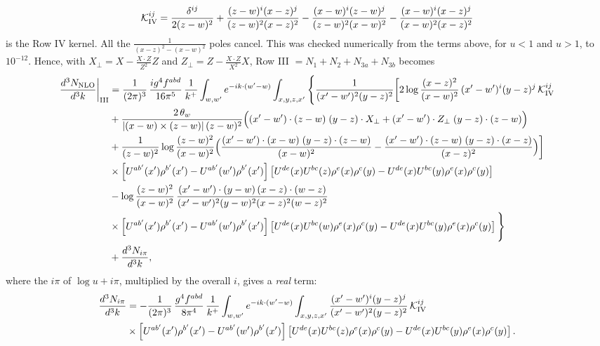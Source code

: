 \documentclass[9pt]{article}
\numberwithin{equation}{section}
\begin{document}
{\begin{equation}
\mathcal K^{ij}_{\rm IV}=\frac{\delta^{ij}}{2(z-w)^{2}}+\frac{(z-w)^{i}(x-z)^{j}}{(z-w)^{2}(x-z)^{2}}-\frac{(x-w)^{i}(z-w)^{j}}{(z-w)^{2}(x-w)^{2}}-\frac{(x-w)^{i}(x-z)^{j}}{(x-w)^{2}(x-z)^{2}}
\end{equation}
is the Row IV kernel. All the $\frac{1}{(x-z)^{2}-(x-w)^{2}}$ poles cancel. This was checked numerically from the terms above, for $u<1$ and $u>1$, to $10^{-12}$. Hence, with $X_{\perp}=X-\frac{X\cdot Z}{Z^{2}}Z$ and $Z_{\perp}=Z-\frac{X\cdot Z}{X^{2}}X$, Row III $=N_{1}+N_{2}+N_{3a}+N_{3b}$ becomes
\begin{align}
\frac{d^{3}N_{\rm NLO}}{d^{3}k}\bigg|_{\rm III}&=\frac{1}{(2\pi)^{3}}\,\frac{ig^{4}f^{abd}}{16\pi^{5}}\,\frac{1}{k^{+}}\int_{w,w'}e^{-ik\cdot(w'-w)}\int_{x,y,z,x'}\Bigg\{\frac{1}{(x'-w')^{2}(y-z)^{2}}\bigg[2\log\frac{(x-z)^{2}}{(x-w)^{2}}\,(x'-w')^{i}(y-z)^{j}\,\mathcal K^{ij}_{\rm IV}\notag\\
&+\frac{2\,\theta_{w}}{|(x-w)\times(z-w)|\,(z-w)^{2}}\Big((x'-w')\cdot(z-w)\;(y-z)\cdot X_{\perp}+(x'-w')\cdot Z_{\perp}\;(y-z)\cdot(z-w)\Big)\notag\\
&+\frac{1}{(z-w)^{2}}\log\frac{(z-w)^{2}}{(x-w)^{2}}\Big(\frac{(x'-w')\cdot(x-w)\;(y-z)\cdot(z-w)}{(x-w)^{2}}-\frac{(x'-w')\cdot(z-w)\;(y-z)\cdot(x-z)}{(x-z)^{2}}\Big)\bigg]\notag\\
&\times\left[U^{ab'}(x')\rho^{b'}(x')-U^{ab'}(w')\rho^{b'}(x')\right]\left[U^{de}(x)U^{bc}(z)\rho^{e}(x)\rho^{c}(y)-U^{de}(x)U^{bc}(y)\rho^{e}(x)\rho^{c}(y)\right]\notag\\
&-\log\frac{(z-w)^{2}}{(x-w)^{2}}\,\frac{(x'-w')\cdot(y-w)\,(x-z)\cdot(w-z)}{(x'-w')^{2}(y-w)^{2}(x-z)^{2}(w-z)^{2}}\notag\\
&\times\left[U^{ab'}(x')\rho^{b'}(x')-U^{ab'}(w')\rho^{b'}(x')\right]\left[U^{de}(x)U^{bc}(w)\rho^{e}(x)\rho^{c}(y)-U^{de}(x)U^{bc}(y)\rho^{e}(x)\rho^{c}(y)\right]\Bigg\}\notag\\
&+\frac{d^{3}N_{i\pi}}{d^{3}k},
\end{align}
where the $i\pi$ of $\log u+i\pi$, multiplied by the overall $i$, gives a \emph{real} term:
\begin{align}
\frac{d^{3}N_{i\pi}}{d^{3}k}&=-\frac{1}{(2\pi)^{3}}\,\frac{g^{4}f^{abd}}{8\pi^{4}}\,\frac{1}{k^{+}}\int_{w,w'}e^{-ik\cdot(w'-w)}\int_{x,y,z,x'}\frac{(x'-w')^{i}(y-z)^{j}}{(x'-w')^{2}(y-z)^{2}}\,\mathcal K^{ij}_{\rm IV}\notag\\
&\times\left[U^{ab'}(x')\rho^{b'}(x')-U^{ab'}(w')\rho^{b'}(x')\right]\left[U^{de}(x)U^{bc}(z)\rho^{e}(x)\rho^{c}(y)-U^{de}(x)U^{bc}(y)\rho^{e}(x)\rho^{c}(y)\right].

\end{align}}
\end{document}

